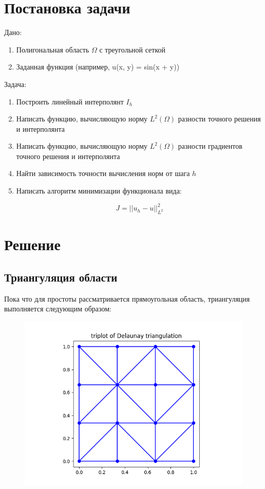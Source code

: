 \documentclass[12pt]{article}
\begin{document}
\section{Постановка задачи}

\quad  Дано:
\begin{enumerate}
\item Полигональная область $\Omega$ с треугольной сеткой
\item Заданная функция (например, u(x, y) = sin(x + y))
\end{enumerate} 

Задача:

\begin{enumerate}
\item Построить линейный интерполянт $I_h$
\item Написать функцию, вычисляющую норму $L^2(\Omega)$ разности точного решения и интерполянта
\item Написать функцию, вычисляющую норму $L^2(\Omega)$ разности градиентов точного решения и интерполянта 
\item Найти зависимость точности вычисления норм от шага $h$
\item Написать алгоритм минимизации функционала вида:

\begin{equation}
J = ||u_h - u||_{L^2}^2
\end{equation}

\end{enumerate} 

\section{Решение}
\subsection{Триангуляция области}
Пока что для простоты рассматривается прямоугольная область, триангуляция выполняется следующим образом:

\begin{figure}[H] \label{fig1}
\centerline{\includegraphics[scale = 0.6]{Figure_1.png}}
\end{figure} 
\end{document}
